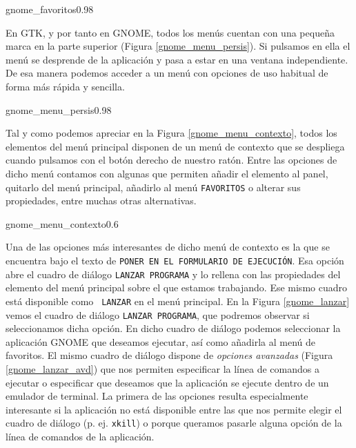 \begin{figura}{gnome_favoritos}{0.98}
\caption{Añadir elemento al menú {\tt FAVORITOS}}
\label{gnome_favoritos}
\end{figura}

En  {\sf  GTK},   y  por  tanto  en  {\sf  GNOME},   todos  los  menús
cuentan  con   una  pequeña  marca   en  la  parte   superior  (Figura
\ref{gnome_menu_persis}). Si pulsamos en ella  el menú se desprende de
la aplicación  y pasa  a estar  en una  ventana independiente.  De esa
manera podemos acceder a un menú con opciones de uso habitual de forma
más rápida y sencilla.

\begin{figura}{gnome_menu_persis}{0.98}
\caption{Hacer que un menú sea persistente}
\label{gnome_menu_persis}
\end{figura}

Tal y  como podemos  apreciar en la  Figura \ref{gnome_menu_contexto},
todos los elementos del menú principal disponen de un menú de contexto
que se despliega cuando pulsamos con el botón derecho de nuestro ratón.
Entre las  opciones de  dicho menú contamos  con algunas  que permiten
añadir el elemento al panel,  quitarlo del menú principal, añadirlo al
menú {\tt  FAVORITOS} o  alterar sus  propiedades, entre  muchas otras
alternativas.

\begin{figura}{gnome_menu_contexto}{0.6}
\caption{Menú de contexto de los elementos del menú principal}
\label{gnome_menu_contexto}
\end{figura}

Una de las  opciones más interesantes de dicho menú  de contexto es la
que  se encuentra  bajo el  texto de  {\tt PONER  EN EL  FORMULARIO DE
EJECUCIÓN}. Esa opción abre el cuadro de diálogo {\tt LANZAR PROGRAMA}
y lo rellena con las propiedades del elemento del menú principal sobre
el que estamos trabajando. Ese  mismo cuadro está disponible como {\tt
LANZAR} en el menú principal. En la Figura \ref{gnome_lanzar} vemos el
cuadro  de diálogo  {\tt LANZAR  PROGRAMA}, que  podremos observar  si
seleccionamos  dicha  opción.  En  dicho  cuadro  de  diálogo  podemos
seleccionar la aplicación {\sf GNOME}  que deseamos ejecutar, así como
añadirla al menú  de favoritos. El mismo cuadro de  diálogo dispone de
{\em  opciones  avanzadas}  (Figura  \ref{gnome_lanzar_avd})  que  nos
permiten especificar la línea de comandos a ejecutar o especificar que
deseamos  que  la aplicación  se  ejecute  dentro  de un  emulador  de
terminal. La primera de las opciones resulta especialmente interesante
si la aplicación  no está disponible entre las que  nos permite elegir
el cuadro  de diálogo (p. ej.  {\tt xkill}) o porque  queramos pasarle
alguna opción de la línea de comandos de la aplicación.

